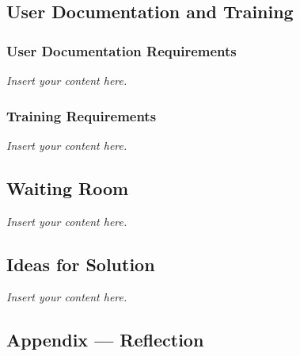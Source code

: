 \documentclass[12pt]{article}
\newcommand{\lips}{\textit{Insert your content here.}}
\begin{document}
\subsection{User Documentation and Training}
\subsubsection{User Documentation Requirements}
\lips
\subsubsection{Training Requirements}
\lips

\subsection{Waiting Room}
\lips

\subsection{Ideas for Solution}
\lips

\newpage{}
\subsection*{Appendix --- Reflection}




\end{document}

